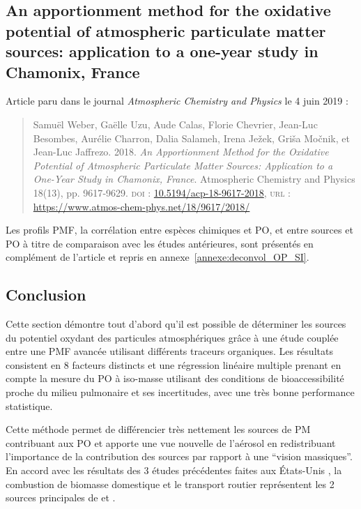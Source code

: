 \subsection{An apportionment method for the oxidative potential of atmospheric particulate
matter sources: application to a one-year study in Chamonix, France}
\label{sec:weber_et_al_2018}

\begin{tcolorbox}[colback=red!5!white,colframe=Melon,title=Note]
Article paru dans le journal \textit{Atmospheric Chemistry and Physics} le 4 juin 2019 :

\begin{quote}
    Samuël Weber, Gaëlle Uzu, Aude Calas, Florie Chevrier, Jean-Luc Besombes,
    Aurélie Charron, Dalia Salameh, Irena Ježek, Griša Močnik, et Jean-Luc Jaffrezo. 2018.
    \textit{An Apportionment Method for the Oxidative Potential of Atmospheric Particulate
    Matter Sources: Application to a One-Year Study in Chamonix, France}. Atmospheric
    Chemistry and Physics 18(13), pp. 9617‑9629.
    \textsc{doi} : \href{https://doi.org/10.5194/acp-18-9617-2018}{10.5194/acp-18-9617-2018},
    \textsc{url} : \url{https://www.atmos-chem-phys.net/18/9617/2018/}
\end{quote}

Les profils PMF, la corrélation entre espèces chimiques et PO, et entre sources et
PO à titre de comparaison avec les études antérieures, sont présentés en complément de
l'article et repris en annexe~\ref{annexe:deconvol_OP_SI}.
\end{tcolorbox}

\clearpage


\subsection{Conclusion}

Cette section démontre tout d'abord qu'il est possible de déterminer les sources du
potentiel oxydant des particules atmosphériques grâce à une étude couplée entre une PMF
avancée utilisant différents traceurs organiques. Les résultats consistent en 8 facteurs
distincts et une régression linéaire multiple prenant en compte
la mesure du PO à iso-masse utilisant des conditions de bioaccessibilité proche du milieu
pulmonaire et ses incertitudes, avec une très bonne performance statistique.

Cette méthode permet de différencier très nettement les sources de PM contribuant aux PO
et apporte une vue nouvelle de l'aérosol en redistribuant l'importance de la contribution
des sources par rapport à une ``vision massiques''. En accord avec les résultats des 3
études précédentes faites aux États-Unis
\autocite{vermaReactive2014,batesReactive2015,fangOxidative2016}, la combustion de
biomasse domestique et le transport routier représentent les 2 sources principales de
\POAAv{} et \PODTTv.

